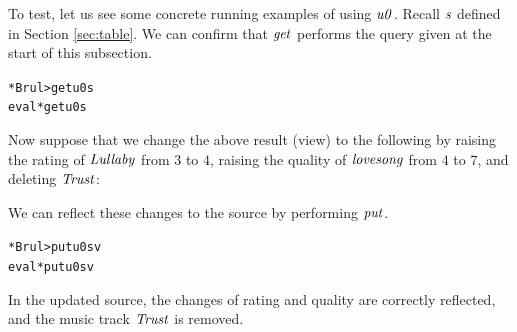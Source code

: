 To test, let us see some concrete running examples of using \ensuremath{\Varid{u0}}.
Recall \ensuremath{\Varid{s}} defined in Section \ref{sec:table}. We can confirm that \ensuremath{\Varid{get}} performs
the query given at the start of this subsection.
{\small
\begin{alltt}
*Brul> get u0 s
eval*{get u0 s}
\end{alltt}
}
Now suppose that we change the above result (view) to the following
by raising the rating of \ensuremath{\Conid{Lullaby}} from \ensuremath{\mathrm{3}} to \ensuremath{\mathrm{4}}, raising the quality of \ensuremath{\Varid{lovesong}} from \ensuremath{\mathrm{4}} to \ensuremath{\mathrm{7}}, and deleting \ensuremath{\Conid{Trust}}:
\resethooks
We can reflect these changes to the source by performing \ensuremath{\Varid{put}}.
{\small
\begin{alltt}
*Brul> put u0 s v
eval*{put u0 s v}
\end{alltt}
}
In the updated source, the changes of rating and quality are correctly reflected,
and the music track \ensuremath{\Conid{Trust}} is removed.




